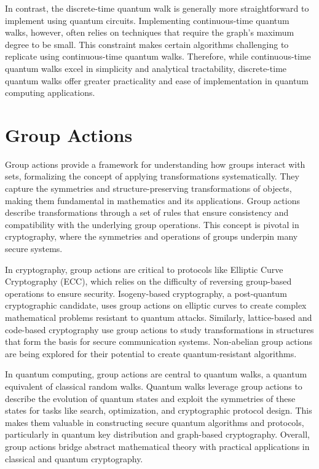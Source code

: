 \documentclass[11pt]{article}
\theoremstyle{definition}
\begin{document}
In contrast, the discrete-time quantum walk is generally more straightforward to implement using quantum circuits. Implementing continuous-time quantum walks, however, often relies on techniques that require the graph's maximum degree to be small. This constraint makes certain algorithms challenging to replicate using continuous-time quantum walks. Therefore, while continuous-time quantum walks excel in simplicity and analytical tractability, discrete-time quantum walks offer greater practicality and ease of implementation in quantum computing applications.






\section{Group Actions}

Group actions provide a framework for understanding how groups interact with sets, formalizing the concept of applying transformations systematically. They capture the symmetries and structure-preserving transformations of objects, making them fundamental in mathematics and its applications. Group actions describe transformations through a set of rules that ensure consistency and compatibility with the underlying group operations. This concept is pivotal in cryptography, where the symmetries and operations of groups underpin many secure systems.

In cryptography, group actions are critical to protocols like Elliptic Curve Cryptography (ECC), which relies on the difficulty of reversing group-based operations to ensure security. Isogeny-based cryptography, a post-quantum cryptographic candidate, uses group actions on elliptic curves to create complex mathematical problems resistant to quantum attacks. Similarly, lattice-based and code-based cryptography use group actions to study transformations in structures that form the basis for secure communication systems. Non-abelian group actions are being explored for their potential to create quantum-resistant algorithms.

In quantum computing, group actions are central to quantum walks, a quantum equivalent of classical random walks. Quantum walks leverage group actions to describe the evolution of quantum states and exploit the symmetries of these states for tasks like search, optimization, and cryptographic protocol design. This makes them valuable in constructing secure quantum algorithms and protocols, particularly in quantum key distribution and graph-based cryptography. Overall, group actions bridge abstract mathematical theory with practical applications in classical and quantum cryptography.
\end{document}
